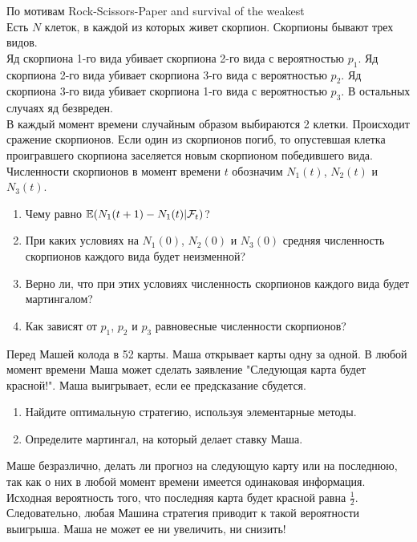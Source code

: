 \begin{problem}
По мотивам Rock-Scissors-Paper and survival of the weakest \\
Есть $N$ клеток, в каждой из которых живет скорпион. Скорпионы
бывают трех видов. \\
Яд скорпиона 1-го вида убивает скорпиона 2-го вида с вероятностью
$p_{1}$. Яд скорпиона 2-го вида убивает скорпиона 3-го вида с
вероятностью $p_{2}$. Яд скорпиона 3-го вида убивает скорпиона
1-го вида с вероятностью $p_{3}$. В остальных случаях яд
безвреден. \\
В каждый момент времени случайным образом выбираются 2 клетки.
Происходит сражение скорпионов. Если один из скорпионов погиб, то
опустевшая клетка проигравшего скорпиона заселяется новым
скорпионом победившего вида. \\
Численности скорпионов в момент времени $t$ обозначим $N_{1}(t)$,
$N_{2}(t)$ и $N_{3}(t)$.
\begin{enumerate}
\item Чему равно $\mathbb{E}(N_{1}(t+1)-N_{1}(t)|\mathcal{F}_{t})$?
\item При каких условиях на $N_{1}(0)$, $N_{2}(0)$ и $N_{3}(0)$
средняя численность скорпионов каждого вида будет неизменной?
\item Верно ли, что при этих условиях численность скорпионов каждого
вида будет мартингалом?
\item Как зависят от $p_{1}$, $p_{2}$ и $p_{3}$ равновесные
численности скорпионов?
\end{enumerate}

\begin{sol}

\end{sol}
\end{problem}

\begin{problem}
Перед Машей колода в 52 карты. Маша открывает карты одну за одной.
В любой момент времени Маша может сделать заявление "Следующая
карта будет красной!". Маша выигрывает, если ее
предсказание сбудется.
\begin{enumerate}
\item Найдите оптимальную стратегию, используя элементарные методы.
\item Определите мартингал, на который делает ставку Маша.
\end{enumerate}

\begin{sol}
Маше безразлично, делать ли прогноз на следующую карту или на
последнюю, так как о них в любой момент времени имеется одинаковая
информация. Исходная вероятность того, что последняя карта будет
красной равна $\frac{1}{2}$. Следовательно, любая Машина стратегия
приводит к такой вероятности выигрыша. Маша не может ее ни
увеличить, ни снизить!
\end{sol}
\end{problem}

